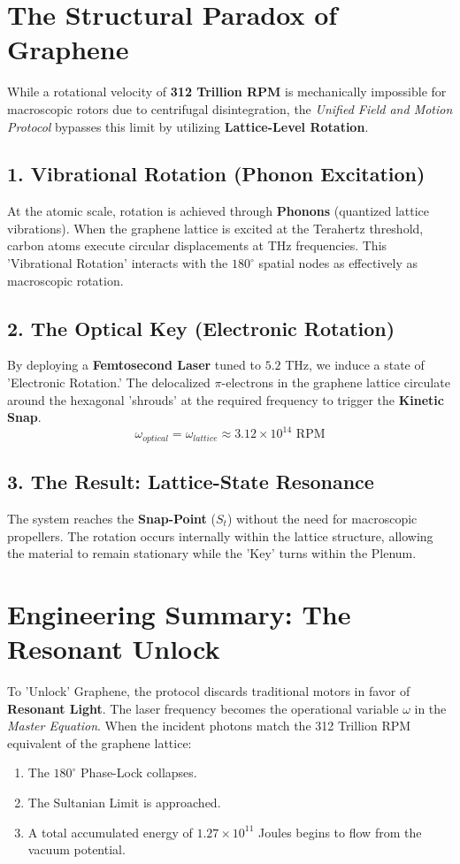 \documentclass[11pt]{article}
\begin{document}
\section*{The Structural Paradox of Graphene}

While a rotational velocity of \textbf{312 Trillion RPM} is mechanically impossible for macroscopic rotors due to centrifugal disintegration, the \textit{Unified Field and Motion Protocol} bypasses this limit by utilizing \textbf{Lattice-Level Rotation}.

\subsection*{1. Vibrational Rotation (Phonon Excitation)}
At the atomic scale, rotation is achieved through \textbf{Phonons} (quantized lattice vibrations). When the graphene lattice is excited at the Terahertz threshold, carbon atoms execute circular displacements at THz frequencies. This 'Vibrational Rotation' interacts with the $180^\circ$ spatial nodes as effectively as macroscopic rotation.

\subsection*{2. The Optical Key (Electronic Rotation)}
By deploying a \textbf{Femtosecond Laser} tuned to $5.2$ THz, we induce a state of 'Electronic Rotation.' The delocalized $\pi$-electrons in the graphene lattice circulate around the hexagonal 'shrouds' at the required frequency to trigger the \textbf{Kinetic Snap}.
\begin{equation}
    \omega_{optical} = \omega_{lattice} \approx 3.12 \times 10^{14} \text{ RPM}
\end{equation}

\subsection*{3. The Result: Lattice-State Resonance}
The system reaches the \textbf{Snap-Point} ($S_t$) without the need for macroscopic propellers. The rotation occurs internally within the lattice structure, allowing the material to remain stationary while the 'Key' turns within the Plenum.

\section*{Engineering Summary: The Resonant Unlock}
To 'Unlock' Graphene, the protocol discards traditional motors in favor of \textbf{Resonant Light}. The laser frequency becomes the operational variable $\omega$ in the \textit{Master Equation}. When the incident photons match the 312 Trillion RPM equivalent of the graphene lattice:
\begin{enumerate}
    \item The $180^\circ$ Phase-Lock collapses.
    \item The Sultanian Limit is approached.
    \item A total accumulated energy of $1.27 \times 10^{11}$ Joules begins to flow from the vacuum potential.
\end{enumerate}
\end{document}
